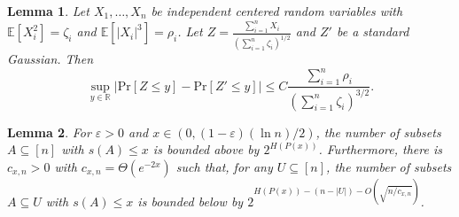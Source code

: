 \documentclass[10pt,a4paper]{amsart}
\newtheorem{lemma}{Lemma}
\newcommand{\eps}{\varepsilon}
\newcommand{\pr}{\mathrm{Pr}}
\begin{document}
\begin{lemma}\label{lem:B-E}
    Let $X_1,\dots,X_n$ be independent centered random variables with $\mathbb{E}[X_i^2] = \zeta_i$ and $\mathbb{E}[|X_i|^3] = \rho_i$. Let $Z = \frac{\sum_{i=1}^{n}X_i}{(\sum_{i=1}^{n}\zeta_i)^{1/2}}$ and $Z'$ be a standard Gaussian. Then 
    \[
        \sup_{y\in \mathbb{R}} |\pr[Z \le y] - \pr[Z' \le y]| \le C\frac{\sum_{i=1}^{n}\rho_i}{(\sum_{i=1}^{n}\zeta_i)^{3/2}}.
    \]
\end{lemma}

\begin{lemma}\label{lem:main-ent}
    For $\eps>0$ and $x \in (0,(1-\eps)(\ln n)/2)$, the number of subsets $A\subseteq [n]$ with $s(A) \le x$ is bounded above by $2^{H(P(x))}$. 
    Furthermore, there is $c_{x,n}>0$ with $c_{x,n} = \Theta(e^{-2x})$ such that, for any $U \subseteq [n]$, the number of subsets $A\subseteq U$ with $s(A) \le x$ is bounded below by $2^{H(P(x)) - (n-|U|) - O(\sqrt{n/c_{x,n}})}$.
\end{lemma}
\end{document}
